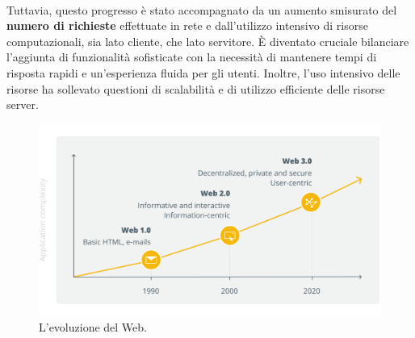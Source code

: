 \\Tuttavia, questo progresso è stato accompagnato da un aumento smisurato del \textbf{numero di richieste} effettuate in rete e dall'utilizzo intensivo di risorse computazionali, sia lato cliente, che lato servitore.
È diventato cruciale bilanciare l'aggiunta di funzionalità sofisticate con la necessità di mantenere tempi di risposta rapidi e un'esperienza fluida per gli utenti. Inoltre, l'uso intensivo delle risorse ha sollevato questioni di scalabilità e di utilizzo efficiente delle risorse server.
\begin{figure}
        \begin{center}
                \includegraphics[width=0.9\columnwidth]{images/WebEvolution.png}
        \end{center}
        \caption{L'evoluzione del Web.}
        \label{fig:spa}
\end{figure}
        
